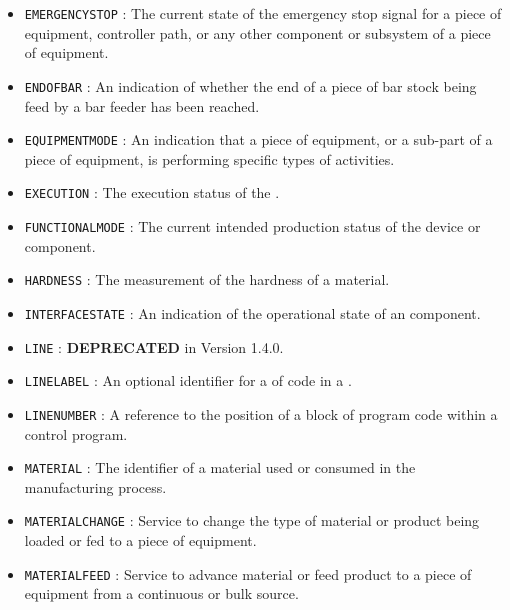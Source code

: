 \begin{itemize}
\item \texttt{EMERGENCY\textunderscore STOP} : The current state of the emergency stop signal for a piece of equipment, controller path, or any other component or subsystem of a piece of equipment. 

\item \texttt{END\textunderscore OF\textunderscore BAR} : An indication of whether the end of a piece of bar stock being feed by a bar feeder has been reached. 

\item \texttt{EQUIPMENT\textunderscore MODE} : An indication that a piece of equipment, or a sub-part of a piece of equipment, is performing specific types of activities. 

\item \texttt{EXECUTION} : The execution status of the . 

\item \texttt{FUNCTIONAL\textunderscore MODE} : The current intended production status of the device or component. 

\item \texttt{HARDNESS} : The measurement of the hardness of a material. 

\item \texttt{INTERFACE\textunderscore STATE} : An indication of the operational state of an  component. 

\item \texttt{LINE} : \textbf{DEPRECATED} in Version 1.4.0. 

\item \texttt{LINE\textunderscore LABEL} : An optional identifier for a  of code in a . 

\item \texttt{LINE\textunderscore NUMBER} : A reference to the position of a block of program code within a control program. 

\item \texttt{MATERIAL} : The identifier of a material used or consumed in the manufacturing process. 

\item \texttt{MATERIAL\textunderscore CHANGE} : Service to change the type of material or product being loaded or fed to a piece of equipment. 

\item \texttt{MATERIAL\textunderscore FEED} : Service to advance material or feed product to a piece of equipment from a continuous or bulk source. 


\end{itemize}
